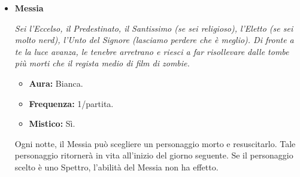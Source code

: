 \documentclass[a4paper,10pt]{article}
\begin{document}
\begin{itemize}
            \emph{Hai costruito una carriera parlando con i morti, facendo soldi facili alle spalle dei boccaloni disposti a sganciare un bel po' di grano per sapere che la bisnonna Gertrude ha trovato la pace nell'aldilà. Andava tutto benissimo, almeno fino a quando i morti non hanno effettivamente cominciato a risponderti. Adesso che dici la verità, hai perso tutta la tua clientela: la nipote della povera Gertrude non voleva davvero sapere qual era l'ingrediente segreto del polpettone.}

            \begin{multicols}{3}
                  \begin{itemize}
                        \item \textbf{Aura:} Nera.
                        \item \textbf{Frequenza:} 1/2 notti.
                        \item \textbf{Mistico:} Sì.
                  \end{itemize}
            \end{multicols}

            Ogni due notti, il Medium può scegliere un personaggio morto e contattarne lo spirito. Scopre il ruolo di tale personaggio. Se tale personaggio utilizza un potere quella notte, tale potere non ha effetto.

      \item \textbf{Messia}

            \emph{Sei l'Eccelso, il Predestinato, il Santissimo (se sei religioso), l'Eletto (se sei molto nerd), l'Unto del Signore (lasciamo perdere che è meglio). Di fronte a te la luce avanza, le tenebre arretrano e riesci a far risollevare dalle tombe più morti che il regista medio di film di zombie.}

            \begin{multicols}{3}
                  \begin{itemize}
                        \item \textbf{Aura:} Bianca.
                        \item \textbf{Frequenza:} 1/partita.
                        \item \textbf{Mistico:} Sì.
                  \end{itemize}
            \end{multicols}

            Ogni notte, il Messia può scegliere un personaggio morto e resuscitarlo. Tale personaggio ritornerà in vita all'inizio del giorno seguente. Se il personaggio scelto è uno Spettro, l'abilità del Messia non ha effetto.


\end{itemize}
\end{document}
